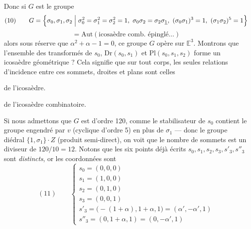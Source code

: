 \documentclass[11pt,a4paper]{article}
\begin{document}
Donc si $G$ est le groupe
\[ (10) \qquad G = \Bigl\{ \sigma_0, \sigma_1, \sigma_2 \Bigm| \sigma_0^2 = \sigma_1^2 = \sigma_2^2 = 1,\ \sigma_0\sigma_2 = \sigma_2\sigma_{\uncertain{1}},\ (\sigma_0\sigma_1)^3 = 1,\ (\sigma_1\sigma_2)^5 = 1 \Bigr\} \]
\[ = \mathrm{Aut}(\text{icosaèdre comb. épinglé} \ldots) \]
alors sous réserve que $\alpha^2 + \alpha - 1 = 0$, ce groupe  $G$ opère  sur $\mathbb{E}^3$. Montrons que l'ensemble des transformés de $s_0$, $\mathrm{Dr}(s_0, s_1)$ et $\mathrm{Pl}(s_0, s_1, s_2)$ forme un icosaèdre géométrique ? Cela signifie que sur tout corps, les seules relations d'incidence entre ces  sommets, droites et plans sont celles

de l'icosaèdre.

 de l'icosaèdre combinatoire.

Si nous admettons que $G$ est  d'ordre 120, comme le stabilisateur de $s_0$ contient le groupe  engendré par $v$ (cyclique d'ordre 5) en plus de $\sigma_1$ --- donc le groupe diédral $\{1, \sigma_1\}\cdot Z$ (produit semi-direct), on voit que le nombre de sommets est un diviseur de $120/10 = 12$. Notons que les six points déjà écrits $s_0, s_1, s_2, s_3, s'_3, s''_3$ sont \emph{distincts}, or les coordonnées sont
\[ (11) \qquad \begin{cases}
s_0 = (0, 0, 0) \\
s_1 = (1, 0, 0) \\
s_2 = (0, 1, 0) \\
s_3 = (0, 0, 1) \\
s'_3 = \bigl(-(1+\alpha), 1+\alpha, 1\bigr) = (\alpha', -\alpha', 1) \\
s''_3 = (0, 1+\alpha, 1) = (0, -\alpha', 1)
\end{cases} \]
\end{document}
